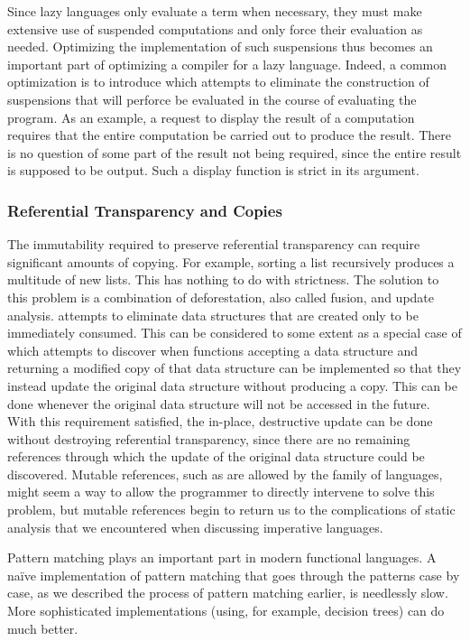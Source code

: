 Since lazy languages only evaluate a term when necessary, they must make extensive use of suspended computations and only force their evaluation as needed. Optimizing the implementation of such suspensions thus becomes an important part of optimizing a compiler for a lazy language. Indeed, a common optimization is to introduce  which attempts to eliminate the construction of suspensions that will perforce be evaluated in the course of evaluating the program. As an example, a request to display the result of a computation requires that the entire computation be carried out to produce the result. There is no question of some part of the result not being required, since the entire result is supposed to be output. Such a display function is strict in its argument.

\subsubsection{Referential Transparency and Copies}
The immutability required to preserve referential transparency can require significant amounts of copying. For example, sorting a list recursively produces a multitude of new lists. This has nothing to do with strictness. The solution to this problem is a combination of deforestation, also called fusion, and update analysis.  attempts to eliminate  data structures that are created only to be immediately consumed. This can be considered to some extent as a special case of  which attempts to discover when functions accepting a data structure and returning a modified copy of that data structure can be implemented so that they instead update the original data structure without producing a copy. This can be done whenever the original data structure will not be accessed in the future. With this requirement satisfied, the in-place, destructive update can be done without destroying referential transparency, since there are no remaining references through which the update of the original data structure could be discovered. Mutable references, such as are allowed by the \ML family of languages, might seem a way to allow the programmer to directly intervene to solve this problem, but mutable references begin to return us to the complications of static analysis that we encountered when discussing imperative languages.

Pattern matching plays an important part in modern functional languages. A na{\"i}ve implementation of pattern matching that goes through the patterns case by case, as we described the process of pattern matching earlier, is needlessly slow. More sophisticated implementations (using, for example, decision trees) can do much better.

